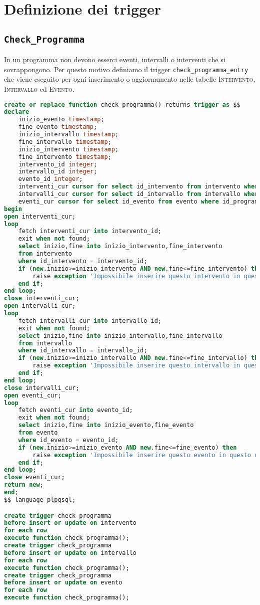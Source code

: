 \section{Definizione dei trigger}
\subsection{\texttt{Check\_Programma}}
In un programma non devono esserci eventi, intervalli o interventi che si sovrappongono. Per questo motivo definiamo il trigger \texttt{check\_programma\_entry} che viene eseguito per ogni inserimento o aggiornamento nelle tabelle \textsc{Intervento}, \textsc{Intervallo} ed \textsc{Evento}.
\begin{lstlisting}[language=SQL,style=mystyle,caption={check\_programma\_entry}]
create or replace function check_programma() returns trigger as $$
declare
    inizio_evento timestamp;
    fine_evento timestamp;
    inizio_intervallo timestamp;
    fine_intervallo timestamp;
    inizio_intervento timestamp;
    fine_intervento timestamp;
    intervento_id integer;
    intervallo_id integer;
    evento_id integer;
    interventi_cur cursor for select id_intervento from intervento where id_programma = new.id_programma;
    intervalli_cur cursor for select id_intervallo from intervallo where id_programma = new.id_programma;
    eventi_cur cursor for select id_evento from evento where id_programma = new.id_programma;
begin
open interventi_cur;
loop 
    fetch interventi_cur into intervento_id;
    exit when not found;
    select inizio,fine into inizio_intervento,fine_intervento
    from intervento
    where id_intervento = intervento_id;
    if (new.inizio>=inizio_intervento AND new.fine<=fine_intervento) then
        raise exception 'Impossibile inserire questo intervento in questo orario';
    end if;
end loop;
close interventi_cur;
open intervalli_cur;
loop 
    fetch intervalli_cur into intervallo_id;
    exit when not found;
    select inizio,fine into inizio_intervallo,fine_intervallo
    from intervallo
    where id_intervallo = intervallo_id;
    if (new.inizio>=inizio_intervallo AND new.fine<=fine_intervallo) then
        raise exception 'Impossibile inserire questo intervallo in questo orario';
    end if;
end loop;
close intervalli_cur;
open eventi_cur;
loop 
    fetch eventi_cur into evento_id;
    exit when not found;
    select inizio,fine into inizio_evento,fine_evento
    from evento
    where id_evento = evento_id;
    if (new.inizio>=inizio_evento AND new.fine<=fine_evento) then
        raise exception 'Impossibile inserire questo evento in questo orario';
    end if;
end loop;
close eventi_cur;
return new;
end;
$$ language plpgsql;

create trigger check_programma
before insert or update on intervento
for each row
execute function check_programma();
create trigger check_programma
before insert or update on intervallo
for each row
execute function check_programma();
create trigger check_programma
before insert or update on evento
for each row
execute function check_programma();
\end{lstlisting}

